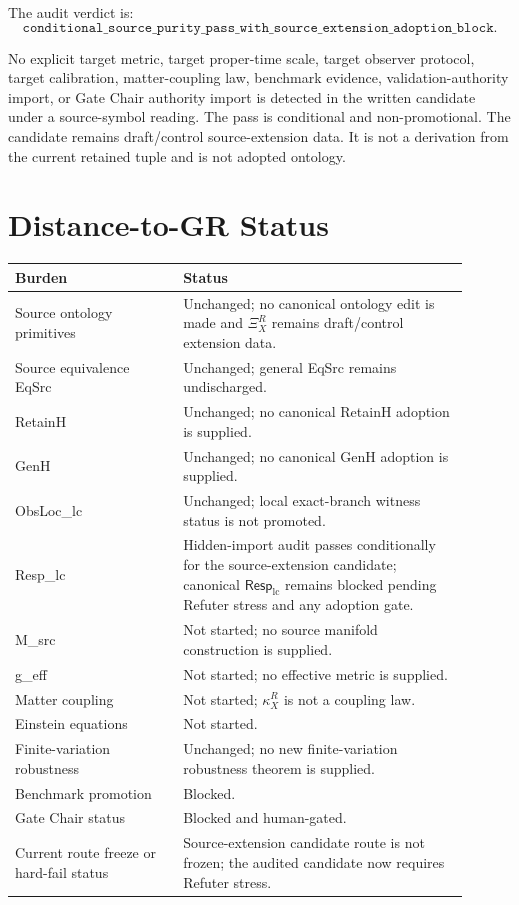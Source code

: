 \documentclass[11pt]{article}
\newcommand{\RespLC}{\mathsf{Resp}_{\mathrm{lc}}}
\newcommand{\XiR}{\Xi_X^R}
\begin{document}
The audit verdict is:
\[
\texttt{conditional\_source\_purity\_pass\_with\_source\_extension\_adoption\_block}.
\]

No explicit target metric, target proper-time scale, target observer
protocol, target calibration, matter-coupling law, benchmark evidence,
validation-authority import, or Gate Chair authority import is detected
in the written candidate under a source-symbol reading. The pass is
conditional and non-promotional. The candidate remains draft/control
source-extension data. It is not a derivation from the current retained
tuple and is not adopted ontology.

\section{Distance-to-GR Status}

\begin{center}
\begin{tabular}{p{0.33\linewidth}p{0.57\linewidth}}
\hline
Burden & Status \\
\hline
Source ontology primitives & Unchanged; no canonical ontology edit is made and \(\XiR\) remains draft/control extension data. \\
Source equivalence EqSrc & Unchanged; general EqSrc remains undischarged. \\
RetainH & Unchanged; no canonical RetainH adoption is supplied. \\
GenH & Unchanged; no canonical GenH adoption is supplied. \\
ObsLoc\_lc & Unchanged; local exact-branch witness status is not promoted. \\
Resp\_lc & Hidden-import audit passes conditionally for the source-extension candidate; canonical \(\RespLC\) remains blocked pending Refuter stress and any adoption gate. \\
M\_src & Not started; no source manifold construction is supplied. \\
g\_eff & Not started; no effective metric is supplied. \\
Matter coupling & Not started; \(\kappa_X^R\) is not a coupling law. \\
Einstein equations & Not started. \\
Finite-variation robustness & Unchanged; no new finite-variation robustness theorem is supplied. \\
Benchmark promotion & Blocked. \\
Gate Chair status & Blocked and human-gated. \\
Current route freeze or hard-fail status & Source-extension candidate route is not frozen; the audited candidate now requires Refuter stress. \\
\hline
\end{tabular}
\end{center}
\end{document}
